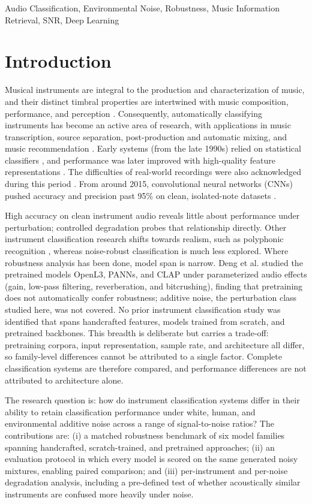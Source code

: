 \documentclass[conference]{IEEEtran}
\begin{document}
\begin{IEEEkeywords}
Audio Classification, Environmental Noise, Robustness, Music Information Retrieval, SNR, Deep Learning
\end{IEEEkeywords}

\section{Introduction}
Musical instruments are integral to the production and characterization of music, and their distinct timbral properties are intertwined with music composition, performance, and perception \cite{b1}. Consequently, automatically classifying instruments has become an active area of research, with applications in music transcription, source separation, post-production and automatic mixing, and music recommendation \cite{b2}. Early systems (from the late 1990s) relied on statistical classifiers \cite{b3}, and performance was later improved with high-quality feature representations \cite{b4}. The difficulties of real-world recordings were also acknowledged during this period \cite{b5}. From around 2015, convolutional neural networks (CNNs) pushed accuracy and precision past 95\% on clean, isolated-note datasets \cite{b6,b7,b8}.

High accuracy on clean instrument audio reveals little about performance under perturbation; controlled degradation probes that relationship directly. Other instrument classification research shifts towards realism, such as polyphonic recognition \cite{b9}, whereas noise-robust classification is much less explored. Where robustness analysis has been done, model span is narrow. Deng et al. \cite{b10} studied the pretrained models OpenL3, PANNs, and CLAP under parameterized audio effects (gain, low-pass filtering, reverberation, and bitcrushing), finding that pretraining does not automatically confer robustness; additive noise, the perturbation class studied here, was not covered. No prior instrument classification study was identified that spans handcrafted features, models trained from scratch, and pretrained backbones. This breadth is deliberate but carries a trade-off: pretraining corpora, input representation, sample rate, and architecture all differ, so family-level differences cannot be attributed to a single factor. Complete classification systems are therefore compared, and performance differences are not attributed to architecture alone.

The research question is: how do instrument classification systems differ in their ability to retain classification performance under white, human, and environmental additive noise across a range of signal-to-noise ratios? The contributions are: (i) a matched robustness benchmark of six model families spanning handcrafted, scratch-trained, and pretrained approaches; (ii) an evaluation protocol in which every model is scored on the same generated noisy mixtures, enabling paired comparison; and (iii) per-instrument and per-noise degradation analysis, including a pre-defined test of whether acoustically similar instruments are confused more heavily under noise.
\end{document}

